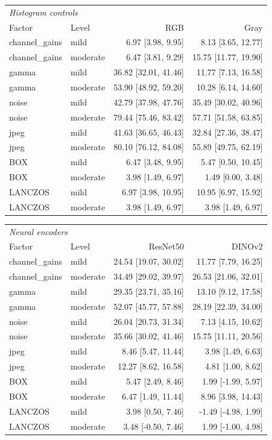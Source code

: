 \begin{tabular}{llrr}\toprule
\multicolumn{4}{l}{\textit{Histogram controls}}\\
Factor & Level & RGB & Gray \\\midrule
channel\_gains & mild & 6.97 [3.98, 9.95] & 8.13 [3.65, 12.77] \\
channel\_gains & moderate & 6.47 [3.81, 9.29] & 15.75 [11.77, 19.90] \\
gamma & mild & 36.82 [32.01, 41.46] & 11.77 [7.13, 16.58] \\
gamma & moderate & 53.90 [48.92, 59.20] & 10.28 [6.14, 14.60] \\
noise & mild & 42.79 [37.98, 47.76] & 35.49 [30.02, 40.96] \\
noise & moderate & 79.44 [75.46, 83.42] & 57.71 [51.58, 63.85] \\
jpeg & mild & 41.63 [36.65, 46.43] & 32.84 [27.36, 38.47] \\
jpeg & moderate & 80.10 [76.12, 84.08] & 55.89 [49.75, 62.19] \\
BOX & mild & 6.47 [3.48, 9.95] & 5.47 [0.50, 10.45] \\
BOX & moderate & 3.98 [1.49, 6.97] & 1.49 [0.00, 3.48] \\
LANCZOS & mild & 6.97 [3.98, 10.95] & 10.95 [6.97, 15.92] \\
LANCZOS & moderate & 3.98 [1.49, 6.97] & 3.98 [1.49, 6.97] \\
\bottomrule\end{tabular}
\par\vspace{8pt}
\begin{tabular}{llrr}\toprule
\multicolumn{4}{l}{\textit{Neural encoders}}\\
Factor & Level & ResNet50 & DINOv2 \\\midrule
channel\_gains & mild & 24.54 [19.07, 30.02] & 11.77 [7.79, 16.25] \\
channel\_gains & moderate & 34.49 [29.02, 39.97] & 26.53 [21.06, 32.01] \\
gamma & mild & 29.35 [23.71, 35.16] & 13.10 [9.12, 17.58] \\
gamma & moderate & 52.07 [45.77, 57.88] & 28.19 [22.39, 34.00] \\
noise & mild & 26.04 [20.73, 31.34] & 7.13 [4.15, 10.62] \\
noise & moderate & 35.66 [30.02, 41.46] & 15.75 [11.11, 20.56] \\
jpeg & mild & 8.46 [5.47, 11.44] & 3.98 [1.49, 6.63] \\
jpeg & moderate & 12.27 [8.62, 16.58] & 4.81 [1.00, 8.62] \\
BOX & mild & 5.47 [2.49, 8.46] & 1.99 [-1.99, 5.97] \\
BOX & moderate & 6.47 [1.49, 11.44] & 8.96 [3.98, 14.43] \\
LANCZOS & mild & 3.98 [0.50, 7.46] & -1.49 [-4.98, 1.99] \\
LANCZOS & moderate & 3.48 [-0.50, 7.46] & 1.99 [-1.00, 4.98] \\
\bottomrule\end{tabular}
\par\vspace{8pt}
